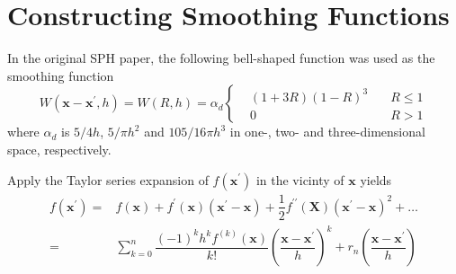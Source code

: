 \documentclass[letterpaper,12pt]{article}
\numberwithin{equation}{section}
\begin{document}
\section{Constructing Smoothing Functions}
In the original SPH paper, the following bell-shaped function was used as the smoothing function
\begin{equation}
    W(\mathbf{x} - \mathbf{x}^\prime, h) = W(R, h) = \alpha_d
    \left\{
        \begin{aligned}
            & (1 + 3R) (1 - R)^3 & \quad R \leq 1 \\
            & 0 & \quad R > 1
        \end{aligned}
    \right.
\end{equation}
where $\alpha_d$ is $5/4 h$, $5/\pi h^2$ and $105/16\pi h^3$ in one-, two- and three-dimensional space, respectively.

Apply the Taylor series expansion of $f(\mathbf{x}^\prime)$ in the vicinty of $\mathbf{x}$ yields
\begin{align}
    f(\mathbf{x}^\prime) =& f(\mathbf{x}) + f^\prime(\mathbf{x}) (\mathbf{x}^\prime  - \mathbf{x}) + \dfrac12 f^{\prime\prime}(\mathbf{X}) (\mathbf{x}^\prime  - \mathbf{x})^2 + \dots \nonumber \\
    =& \sum_{k=0}^n \dfrac{(-1)^k h^k f^{(k)}(\mathbf{x})}{k!} \left( \dfrac{\mathbf{x} - \mathbf{x}^\prime}{h} \right)^k + r_n\left( \dfrac{\mathbf{x} - \mathbf{x}^\prime}{h} \right)
\end{align}
\end{document}
